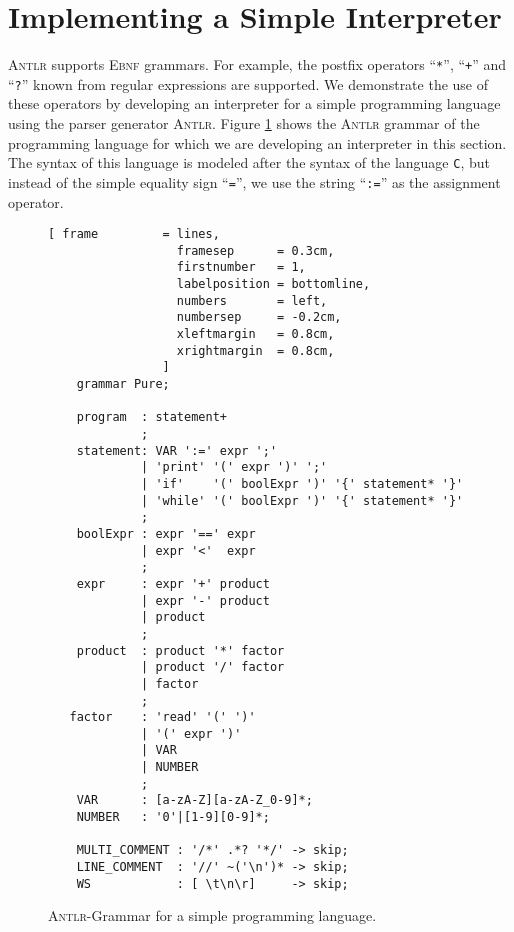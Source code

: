 \section{Implementing a Simple Interpreter  \label{chapter:interpreter}}

\textsc{Antlr} supports \textsc{Ebnf} grammars. For example, the postfix operators
``\texttt{*}'', ``\texttt{+}'' and ``\texttt{?}'' known from regular expressions are
supported. We demonstrate the use of these operators by developing an interpreter for a
simple programming language using the parser generator \textsc{Antlr}. Figure
\ref{fig:Pure.g4} shows the \textsc{Antlr} grammar of the programming language for which
we are developing an interpreter in this section. The syntax of this language is modeled
after the syntax of the language \texttt{C}, but instead of the simple equality sign
``\texttt{=}'', we use the string ``\texttt{:=}'' as the assignment operator.

\begin{figure}[!ht]
\centering
\begin{Verbatim}[ frame         = lines, 
                  framesep      = 0.3cm, 
                  firstnumber   = 1,
                  labelposition = bottomline,
                  numbers       = left,
                  numbersep     = -0.2cm,
                  xleftmargin   = 0.8cm,
                  xrightmargin  = 0.8cm,
                ]
    grammar Pure;
    
    program  : statement+
             ;  
    statement: VAR ':=' expr ';'
             | 'print' '(' expr ')' ';'
             | 'if'    '(' boolExpr ')' '{' statement* '}'
             | 'while' '(' boolExpr ')' '{' statement* '}'
             ;
    boolExpr : expr '==' expr
             | expr '<'  expr
             ;
    expr     : expr '+' product
             | expr '-' product
             | product
             ;
    product  : product '*' factor
             | product '/' factor
             | factor
             ;
   factor    : 'read' '(' ')' 
             | '(' expr ')'
             | VAR
             | NUMBER
             ;
    VAR      : [a-zA-Z][a-zA-Z_0-9]*;
    NUMBER   : '0'|[1-9][0-9]*;
    
    MULTI_COMMENT : '/*' .*? '*/' -> skip;
    LINE_COMMENT  : '//' ~('\n')* -> skip;
    WS            : [ \t\n\r]     -> skip; 
\end{Verbatim}
\vspace*{-0.3cm}
\caption{\textsc{Antlr}-Grammar for a simple programming language.}
\label{fig:Pure.g4}
\end{figure}

